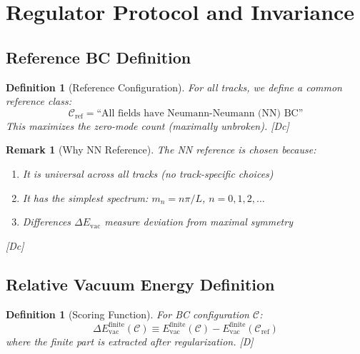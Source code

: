 \documentclass[11pt,a4paper]{article}
\newtheorem{definition}[theorem]{Definition}
\newtheorem{remark}[theorem]{Remark}
\newcommand{\tagD}{\textcolor{blue!70!black}{[D]}}
\newcommand{\tagDc}{\textcolor{blue!50!black}{[Dc]}}
\begin{document}
\section{Regulator Protocol and Invariance}

\subsection{Reference BC Definition}

\begin{definition}[Reference Configuration]
\label{def:bc-ref}
For all tracks, we define a common reference class:
\begin{equation}
\label{eq:bc-ref-class}
\mathcal{C}_{\text{ref}} = \text{``All fields have Neumann-Neumann (NN) BC''}
\end{equation}
This maximizes the zero-mode count (maximally unbroken). \tagDc
\end{definition}

\begin{remark}[Why NN Reference]
The NN reference is chosen because:
\begin{enumerate}
    \item It is universal across all tracks (no track-specific choices)
    \item It has the simplest spectrum: $m_n = n\pi/L$, $n = 0, 1, 2, \ldots$
    \item Differences $\Delta E_{\text{vac}}$ measure deviation from maximal symmetry
\end{enumerate}
\tagDc
\end{remark}

\subsection{Relative Vacuum Energy Definition}

\begin{definition}[Scoring Function]
\label{def:score}
For BC configuration $\mathcal{C}$:
\begin{equation}
\label{eq:score-def}
\boxed{\Delta E_{\text{vac}}^{\text{finite}}(\mathcal{C}) \equiv
E_{\text{vac}}^{\text{finite}}(\mathcal{C}) - E_{\text{vac}}^{\text{finite}}(\mathcal{C}_{\text{ref}})}
\end{equation}
where the finite part is extracted after regularization. \tagD
\end{definition}
\end{document}
